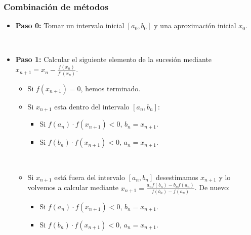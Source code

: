 \documentclass{beamer}
\begin{document}
	
	\begin{frame}
		\frametitle{Combinación de métodos}
		
		\begin{itemize}
			\item \textbf{Paso 0:} Tomar un intervalo inicial $[a_0, b_0]$ y una aproximación inicial $x_0$.
			
			${ }$\\
			\item \textbf{Paso 1:} Calcular el siguiente elemento de la sucesión mediante $x_{n+1} = x_n - \frac{f(x_n)}{f'(x_n)}$.
			${ }$\\
			\begin{itemize}
				\item Si $f(x_{n+1}) = 0$, hemos terminado.
				\item Si $x_{n+1}$ esta dentro del intervalo $[a_n, b_n]$:
				${ }$\\
				\begin{itemize}
					\item Si $f(a_n) \cdot f(x_{n+1}) < 0$, $b_n = x_{n+1}$.
					\item Si $f(b_n) \cdot f(x_{n+1}) < 0$, $a_n = x_{n+1}$.
				\end{itemize}
				${ }$\\
				\item Si $x_{n+1}$ está fuera del intervalo $[a_n, b_n]$ desestimamos $x_{n+1}$ y lo volvemos a calcular mediante $x_{n+1} = \frac{a_n f(b_n) - b_n f(a_n)}{f(b_n) - f(a_n)}$. De nuevo:
				${ }$\\
				\begin{itemize}
					\item Si $f(a_n) \cdot f(x_{n+1}) < 0$, $b_n = x_{n+1}$.
					\item Si $f(b_n) \cdot f(x_{n+1}) < 0$, $a_n = x_{n+1}$.
				\end{itemize}
			\end{itemize}
		\end{itemize}
	\end{frame}
	
\end{document}
